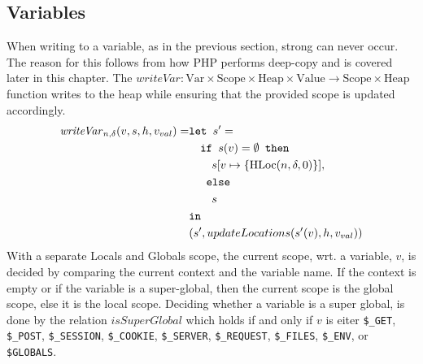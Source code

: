 \subsection{Variables}
When writing to a variable, as in the previous section, strong can never occur. The reason for this follows from how PHP performs deep-copy and is covered later in this chapter. The $\mathit{writeVar}: \text{Var} \times \text{Scope} \times \text{Heap} \times \text{Value} \rightarrow \text{Scope} \times \text{Heap}$ function writes to the heap while ensuring that the provided scope is updated accordingly. 
\begin{align}
\mathit{writeVar}_{n,\delta}(v,s,h,v_{val}) =   &\texttt{let } s' = \notag\\
                            &\quad\texttt{if }s(v) = \emptyset\texttt{ then } \notag\\
                            &\quad\quad s[v\mapsto\{\text{HLoc}(n,\delta, 0)\}], \notag\\
                            &\quad \texttt{ else } \notag\\
                            &\quad\quad s\notag\\
                            & \texttt{in }\notag\\
                            &(s', updateLocations(s'(v), h, v_{val}))
\end{align}
With a separate { Locals} and { Globals} scope, the current scope, wrt. a variable, $v$, is decided by comparing the current context and the variable name. If the context is empty or if the variable is a super-global, then the current scope is the global scope, else it is the local scope. Deciding whether a variable is a super global, is done by the relation $\mathit{isSuperGlobal}$ which holds if and only if $v$ is eiter \texttt{\$\_GET}, \texttt{\$\_POST}, \texttt{\$\_SESSION}, \texttt{\$\_COOKIE}, \texttt{\$\_SERVER}, \texttt{\$\_REQUEST}, \texttt{\$\_FILES}, \texttt{\$\_ENV}, or \texttt{\$GLOBALS}.

